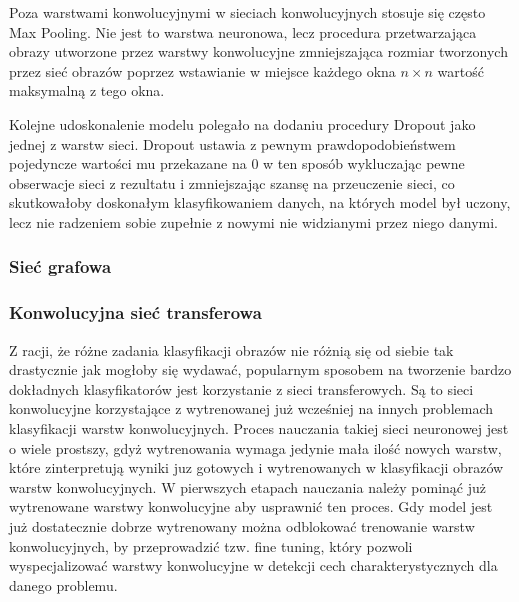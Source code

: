 \documentclass{article}
\begin{document}
Poza warstwami konwolucyjnymi w sieciach konwolucyjnych stosuje się 
często Max Pooling. Nie jest to warstwa neuronowa, lecz procedura 
przetwarzająca obrazy utworzone przez warstwy konwolucyjne zmniejszająca 
rozmiar tworzonych przez sieć obrazów poprzez wstawianie w miejsce każdego 
okna $n \times n$ wartość maksymalną z tego okna.

Kolejne udoskonalenie modelu polegało na dodaniu procedury Dropout jako 
jednej z warstw sieci. Dropout ustawia z pewnym prawdopodobieństwem pojedyncze 
wartości mu przekazane na 0 w ten sposób wykluczając pewne obserwacje sieci z 
rezultatu i zmniejszając szansę na przeuczenie sieci, co skutkowałoby doskonałym 
klasyfikowaniem danych, na których model był uczony, lecz nie radzeniem sobie 
zupełnie z nowymi nie widzianymi przez niego danymi.
\subsubsection{Sieć grafowa}

\subsubsection{Konwolucyjna sieć transferowa}
Z racji, że różne zadania klasyfikacji obrazów nie różnią się od siebie tak drastycznie jak 
mogłoby się wydawać, popularnym sposobem na tworzenie bardzo dokładnych 
klasyfikatorów jest korzystanie z sieci transferowych. Są to sieci konwolucyjne korzystające 
z wytrenowanej już wcześniej na innych problemach klasyfikacji warstw konwolucyjnych. 
Proces nauczania takiej sieci neuronowej jest o wiele prostszy, gdyż wytrenowania wymaga 
jedynie mała ilość nowych warstw, które zinterpretują wyniki juz gotowych i wytrenowanych 
w klasyfikacji obrazów warstw konwolucyjnych. W pierwszych etapach nauczania należy pominąć 
już wytrenowane warstwy konwolucyjne aby usprawnić ten proces. Gdy model jest już dostatecznie 
dobrze wytrenowany można odblokować trenowanie warstw konwolucyjnych, by przeprowadzić tzw. 
fine tuning, który pozwoli wyspecjalizować warstwy konwolucyjne w detekcji cech charakterystycznych dla danego problemu. 
\end{document}
